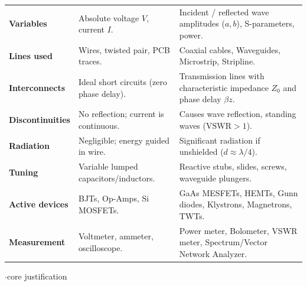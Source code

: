 {\begin{tabularx}{\linewidth}{@{}L{1.8cm}X X@{}}
\textbf{Variables}      & Absolute voltage $V$, current $I$. & Incident / reflected wave amplitudes ($a, b$), S-parameters, power. \\
\textbf{Lines used}     & Wires, twisted pair, PCB traces. & Coaxial cables, Waveguides, Microstrip, Stripline. \\
\textbf{Interconnects}  & Ideal short circuits (zero phase delay). & Transmission lines with characteristic impedance $Z_0$ and phase delay $\beta z$. \\
\textbf{Discontinuities} & No reflection; current is continuous. & Causes wave reflection, standing waves ($\text{VSWR} > 1$). \\
\textbf{Radiation}      & Negligible; energy guided in wire. & Significant radiation if unshielded ($d \approx \lambda/4$). \\
\textbf{Tuning}         & Variable lumped capacitors/inductors. & Reactive stubs, slides, screws, waveguide plungers. \\
\textbf{Active devices} & BJTs, Op-Amps, Si MOSFETs. & GaAs MESFETs, HEMTs, Gunn diodes, Klystrons, Magnetrons, TWTs. \\
\textbf{Measurement}    & Voltmeter, ammeter, oscilloscope. & Power meter, Bolometer, VSWR meter, Spectrum/Vector Network Analyzer. \\
\bottomrule
\end{tabularx}}

\vspace{2pt}

{\color{sub}\footnotesize {}  \gap$\cdot$\gap core justification}

